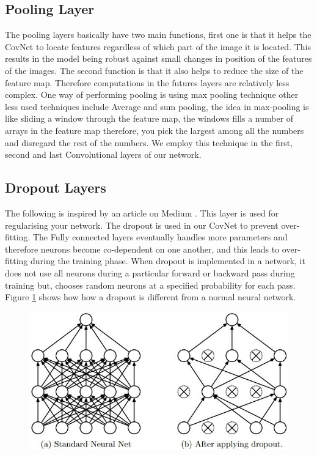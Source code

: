 \documentclass[12pt, a4paper,oneside]{report}
\begin{document}
\subsection{Pooling Layer}
The pooling layers basically have two main functions, first one is that it helps the CovNet to locate features regardless of which part of the image it is located. This results in the model being robust against small changes in position of the features of the images. The second function is that it also helps to reduce the size of the feature map. Therefore computations in the futures layers are relatively less complex. One way of performing pooling is using max pooling technique other less used techniques include Average and sum pooling, the idea in max-pooling is like sliding a window through the feature map, the windows fills a number of arrays in the feature map therefore, you pick the largest among all the numbers and disregard the rest of the numbers. We employ this technique in the first, second and last Convolutional layers of our network.

\subsection{Dropout Layers}
The following is inspired by an article on Medium \cite{dropout}. 
This layer is used for regularising your network. The dropout is used in our CovNet to prevent over-fitting. The Fully connected layers eventually handles more parameters and therefore neurons become co-dependent on one another, and this leads to over-fitting during the training phase. When dropout is implemented in a network, it does not use all neurons during a particular forward or backward pass during training but, chooses random neurons at a specified probability for each pass. Figure \ref{fig:dropout} shows how how a dropout is different from a normal neural network.

\begin{figure}[!htb]
	\includegraphics [scale=0.6] {dropout}
	
	\label{fig:dropout}
\end{figure}
\end{document}
